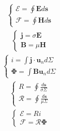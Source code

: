 \documentclass[10pt, twocolumn, a4paper, fleqn]{article}
\def\bb{\mathbf}
\def\E{\bb{E}}
\def\B{\bb{B}}
\def\H{\bb{H}}
\def\j{\bb{j}}
\def\un{\bb{u}_n}
\def\ds{ d\bb{s}}
\begin{document}
\begin{equation*}\begin{split}
\begin{cases}
\mathcal{E}=\oint{\E\ds}\\
\mathcal{F}=\oint{\H\ds}
\end{cases}
\end{split}\end{equation*}
\begin{equation*}\begin{split}
\begin{cases}
\j=\sigma\E\\
\B=\mu\H
\end{cases}
\end{split}\end{equation*}
\begin{equation*}\begin{split}
\begin{cases}
i=\int{\j\cdot\un d\Sigma}\\
\bb{\Phi}=\int{\B\un d\Sigma}
\end{cases}
\end{split}\end{equation*}
\begin{equation*}\begin{split}
\begin{cases}
R=\oint{\frac{\ds}{\sigma\Sigma}}\\
\mathcal{R}=\oint{\frac{\ds}{\mu\Sigma}}
\end{cases}
\end{split}\end{equation*}
\begin{equation*}\begin{split}
\begin{cases}
\mathcal{E}=Ri\\
\mathcal{F}=\mathcal{R}\bb{\Phi}
\end{cases}
\end{split}\end{equation*}
\end{document}

